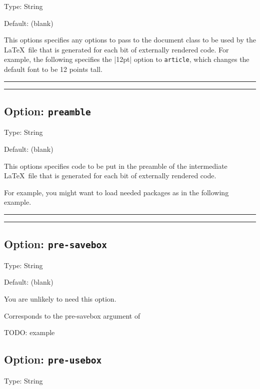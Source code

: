 \documentclass[10pt]{ltxdoc}
\newcommand{\pkg}[1]{\texttt{#1}}
\newcommand{\opt}[1]{\texttt{#1}}
\def\gauge{%
  \rule{0.2em}{7pt}%
  \llap{\rule[8pt]{0.2em}{2pt}}%
}
\begin{document}
Type: String

Default: (blank)

This options specifies any options to pass to the document class to be
used by the \LaTeX\ file that is generated for each bit of externally
rendered code.
For example, the following specifies the |12pt| option to
\pkg{article}, which changes the default font to be 12 points tall.

\begin{tcblisting}{}
\gauge{}\gauge
\end{tcblisting}

\subsection{Option: \opt{preamble}}
\label{subsec:preamble}

Type: String

Default: (blank)

This options specifies code to be put in the preamble of the
intermediate \LaTeX\ file that is generated for each bit of externally
rendered code.

For example, you might want to load needed packages as in the following
example.

\begin{tcblisting}{}
\gauge
{}%
\gauge
\end{tcblisting}

\subsection{Option: \opt{pre-savebox}}
\label{subsec:pre-savebox}

Type: String

Default: (blank)

You are unlikely to need this option.

Corresponds to the pre-savebox argument of 

TODO: example

\subsection{Option: \opt{pre-usebox}}
\label{subsec:pre-usebox}

Type: String
\end{document}
